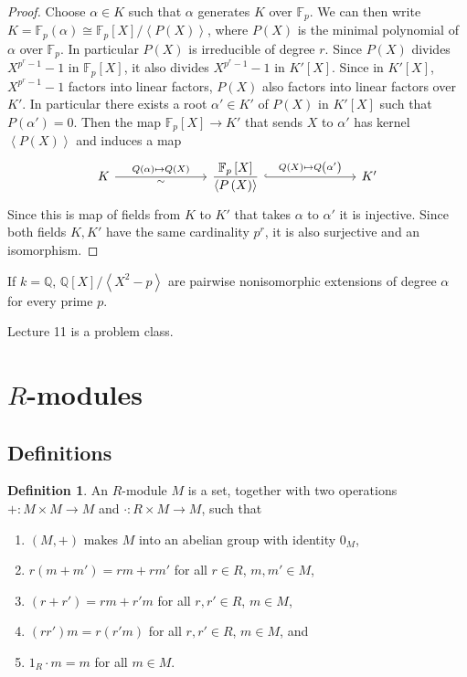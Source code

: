 \documentclass{article}
\newcommand{\F}{\mathbb{F}}
\newcommand{\Q}{\mathbb{Q}}
\newcommand{\rb}[1]{\left( #1 \right)}
\renewcommand{\sb}[1]{\left[ #1 \right]}
\newcommand{\ab}[1]{\left\langle #1 \right\rangle}
\theoremstyle{definition}\newtheorem{definition}{Definition}[subsection]
\theoremstyle{definition}\newtheorem{remark}[definition]{Remark}
\theoremstyle{definition}\newtheorem*{example}{Example}
\theoremstyle{definition}\newtheorem*{note}{Note}
\begin{document}
\begin{proof}
Choose $ \alpha \in K $ such that $ \alpha $ generates $ K $ over $ \F_p $. We can then write $ K = \F_p\rb{\alpha} \cong \F_p\sb{X} / \ab{P\rb{X}} $, where $ P\rb{X} $ is the minimal polynomial of $ \alpha $ over $ \F_p $. In particular $ P\rb{X} $ is irreducible of degree $ r $. Since $ P\rb{X} $ divides $ X^{p^r - 1} - 1 $ in $ \F_p\sb{X} $, it also divides $ X^{p^r - 1} - 1 $ in $ K'\sb{X} $. Since in $ K'\sb{X} $, $ X^{p^r - 1} - 1 $ factors into linear factors, $ P\rb{X} $ also factors into linear factors over $ K' $. In particular there exists a root $ \alpha' \in K' $ of $ P\rb{X} $ in $ K'\sb{X} $ such that $ P\rb{\alpha'} = 0 $. Then the map $ \F_p\sb{X} \to K' $ that sends $ X $ to $ \alpha' $ has kernel $ \ab{P\rb{X}} $ and induces a map
$$
\begin{tikzcd}[column sep=1in]
K \arrow{r}{Q\rb{\alpha} \mapsto Q\rb{X}}[swap]{\sim} & \dfrac{\F_p\sb{X}}{\ab{P\rb{X}}} \arrow[hookrightarrow]{r}{Q\rb{X} \mapsto Q\rb{\alpha'}} & K'
\end{tikzcd}
$$
Since this is map of fields from $ K $ to $ K' $ that takes $ \alpha $ to $ \alpha' $ it is injective. Since both fields $ K, K' $ have the same cardinality $ p^r $, it is also surjective and an isomorphism.
\end{proof}

If $ k = \Q $, $ \Q\sb{X} / \ab{X^2 - p} $ are pairwise nonisomorphic extensions of degree $ \alpha $ for every prime $ p $.


Lecture 11 is a problem class.


\section{$ R $-modules}

\subsection{Definitions}

\begin{definition}
An $ R $-module $ M $ is a set, together with two operations $ + : M \times M \to M $ and $ \cdot : R \times M \to M $, such that
\begin{enumerate}
\item $ \rb{M, +} $ makes $ M $ into an abelian group with identity $ 0_M $,
\item $ r\rb{m + m'} = rm + rm' $ for all $ r \in R $, $ m, m' \in M $,
\item $ \rb{r + r'} = rm + r'm $ for all $ r, r' \in R $, $ m \in M $,
\item $ \rb{rr'}m = r\rb{r'm} $ for all $ r, r' \in R $, $ m \in M $, and
\item $ 1_R \cdot m = m $ for all $ m \in M $.
\end{enumerate}
\end{definition}
\end{document}
